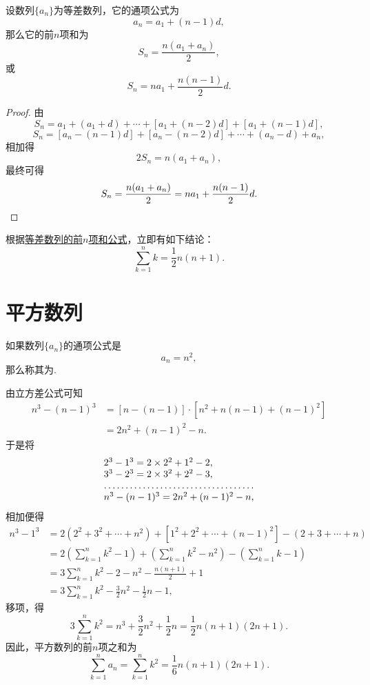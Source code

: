 \begin{property}[等差数列求和]
设数列\(\{a_n\}\)为等差数列，它的通项公式为\[
    a_n = a_1 + (n-1) d,
\]
那么它的前\(n\)项和为\begin{equation}\label{equation:数列.等差数列的前n项和1}
    S_n = \frac{n(a_1 + a_n)}{2},
\end{equation}
或\begin{equation}\label{equation:数列.等差数列的前n项和2}
    S_n = n a_1 + \frac{n(n-1)}{2} d.
\end{equation}
\begin{proof}
由\[
    S_n = a_1 + (a_1 + d) + \dotsb + [a_1 + (n-2)d] + [a_1 + (n-1)d],
\]\[
    S_n = [a_n - (n-1)d] + [a_n - (n-2)d] + \dotsb + (a_n - d) + a_n,
\]相加得\[
    2 S_n = n(a_1 + a_n),
\]最终可得\[
    S_n = \frac{n(a_1 + a_n)}{2} = n a_1 + \frac{n(n-1)}{2} d.
    \qedhere
\]
\end{proof}
\end{property}

根据\hyperref[equation:数列.等差数列的前n项和1]{等差数列的前\(n\)项和公式}，立即有如下结论：
\begin{equation}
    \sum\limits_{k=1}^n k = \frac{1}{2} n(n+1).
\end{equation}

\section{平方数列}
如果数列\(\{a_n\}\)的通项公式是\[
a_n = n^2,
\]那么称其为.

由立方差公式可知
\[\begin{aligned}
n^3 - (n-1)^3
&= [n - (n-1)] \cdot [n^2 + n(n-1) + (n-1)^2] \\
&= 2n^2 + (n-1)^2 - n.
\end{aligned}\]于是将\[
\begin{array}{l}
2^3 - 1^3 = 2\times2^2+1^2-2, \\
3^3 - 2^3 = 2\times3^2+2^2-3, \\
\hdotsfor{1} \\
n^3 - (n-1)^3 = 2n^2 + (n-1)^2 - n,
\end{array}
\]相加便得\[\begin{aligned}
n^3 - 1^3
&= 2(2^2+3^2+\dotsb+n^2) + [1^2+2^2+\dotsb+(n-1)^2] - (2+3+\dotsb+n) \\
&= 2\left(\sum\limits_{k=1}^n k^2 - 1\right)
    + \left(\sum\limits_{k=1}^n k^2 - n^2\right)
    - \left(\sum\limits_{k=1}^n k - 1\right) \\
&= 3\sum\limits_{k=1}^n k^2 - 2 - n^2 - \frac{n(n+1)}{2} + 1 \\
&= 3\sum\limits_{k=1}^n k^2 - \frac{3}{2} n^2 - \frac{1}{2} n - 1,
\end{aligned}\]
移项，得\[
3 \sum\limits_{k=1}^n k^2
= n^3 + \frac{3}{2} n^2 + \frac{1}{2} n
= \frac{1}{2} n (n+1) (2n+1).
\]
因此，平方数列的前\(n\)项之和为
\begin{equation}
	\sum\limits_{k=1}^n a_n
	= \sum\limits_{k=1}^n k^2
	= \frac{1}{6} n(n+1)(2n+1).
\end{equation}

